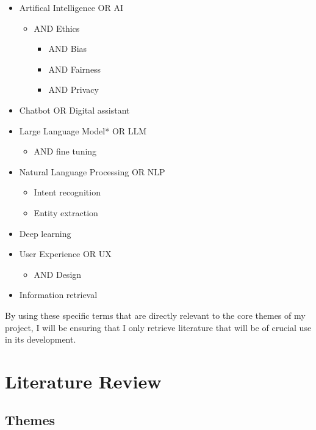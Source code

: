 \documentclass[12pt]{report}
\begin{document}
    \begin{itemize}
        \item Artifical Intelligence OR AI 
        \begin{itemize}
            \item AND Ethics
            \begin{itemize}
                \item AND Bias
                \item AND Fairness
                \item AND Privacy
            \end{itemize}
        \end{itemize}
        \item Chatbot OR Digital assistant
        \item Large Language Model* OR LLM
        \begin{itemize}
            \item AND fine tuning
        \end{itemize}
        \item Natural Language Processing OR NLP
        \begin{itemize}
            \item Intent recognition
            \item Entity extraction
        \end{itemize}
        \item Deep learning
        \item User Experience OR UX
        \begin{itemize}
            \item AND Design
        \end{itemize}
        \item Information retrieval
    \end{itemize}

    \noindent
    By using these specific terms that are directly relevant to the core themes of my project,
    I will be ensuring that I only retrieve literature that will be of crucial use in its 
    development.


    \chapter{Literature Review}

    \section{Themes}
\end{document}
